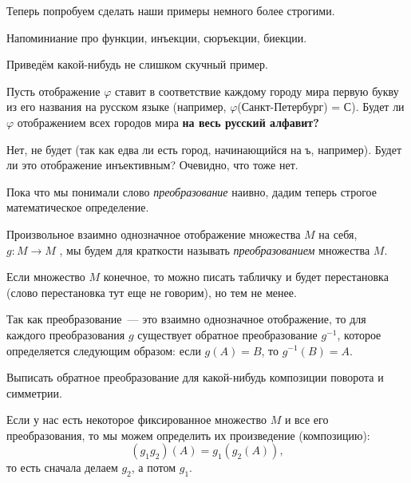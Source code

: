 	Теперь попробуем сделать наши примеры немного более строгими. 

	\begin{definition} 
		Напоминиание про функции, инъекции, сюръекции, биекции. 
	\end{definition}

	Приведём какой-нибудь не слишком скучный пример. 

	\begin{example}
		Пусть отображение $\varphi$ ставит в соответствие каждому городу мира первую букву из его названия на русском языке (например, $\varphi$(Санкт-Петербург) = С). Будет ли $\varphi$ отображением всех городов мира \bf{на} весь русский алфавит?

		Нет, не будет (так как едва ли есть город, начинающийся на ъ, например). Будет ли это отображение инъективным? Очевидно, что тоже нет. 
	\end{example}

	Пока что мы понимали слово \emph{преобразование} наивно, дадим теперь строгое математическое определение. 

	\begin{definition} 
		Произвольное взаимно однозначное отображение множества $M$ на себя, $g\colon M \to M$ , мы будем для краткости называть \emph{преобразованием} множества $M$.
	\end{definition}

	\begin{example}
		Если множество $M$ конечное, то можно писать табличку и будет перестановка (слово перестановка тут еще не говорим), но тем не менее. 
	\end{example}

	\begin{definition} 
		Так как преобразование~--- это взаимно однозначное отображение, то для каждого преобразования $g$ существует обратное преобразование $g^{-1}$, которое определяется следующим образом: если $g(A) = B$, то $g^{-1}(B) = A$.
	\end{definition}

	\begin{example}
		Выписать обратное преобразование для какой-нибудь композиции поворота и симметрии. 
	\end{example}

	Если у нас есть некоторое фиксированное множество $M$ и все его преобразования, то мы можем определить их произведение (композицию): 
	\[
		(g_1 g_2)(A) = g_1(g_2(A)),
	\]
	то есть сначала делаем $g_2$, а потом $g_1$. 

